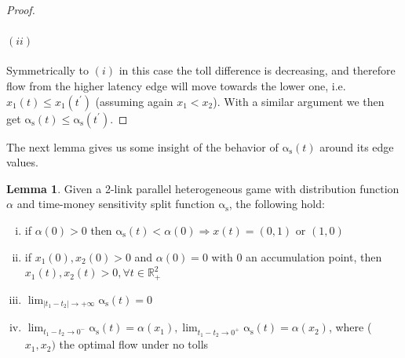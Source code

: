 \documentclass[10pt,a4paper]{book}
\newcommand{\as}{\mathrm{\alpha_s}}
\newcommand{\R}{\mathbb{R}}
\theoremstyle{definition}
\newtheorem{lemma}[definition]{Lemma}
\theoremstyle{comment}
\begin{document}
\begin{proof}
	\paragraph{$(ii)$}
	Symmetrically to $(i)$ in this case the toll difference is decreasing, and therefore flow from the higher latency edge will move towards the lower one, i.e. $x_1(t) \le x_1(t^\prime)$ (assuming again $x_1 < x_2$).
	With a similar argument we then get $\as(t) \le \as(t^\prime)$.
\end{proof}

The next lemma gives us some insight of the behavior of $\as(t)$ around its edge values.
\begin{lemma}
	\label{lemma:split_bounds}
	Given a 2-link parallel heterogeneous game with distribution function $\alpha$ and time-money sensitivity split function $\as$, the following hold:
	\begin{enumerate}[(i)]
		\item if $\alpha(0) > 0$ then $\as(t) < \alpha(0) \Rightarrow x(t) = (0, 1)$ or $(1, 0)$
		\item if $x_1(0), x_2(0) > 0$ and $\alpha(0) = 0$ with $0$ an accumulation point, then $x_1(t), x_2(t) > 0, \forall t \in \R_+^2$
		\item $\lim_{|t_1 - t_2| \rightarrow +\infty}\as(t) = 0$
		\item $\lim_{t_1 - t_2 \rightarrow 0^-} \as(t) = \alpha(x_1), \lim_{t_1 - t_2 \rightarrow 0^+} \as(t) = \alpha(x_2)$, where ($x_1, x_2)$ the optimal flow under no tolls
	\end{enumerate}
\end{lemma}
\end{document}
